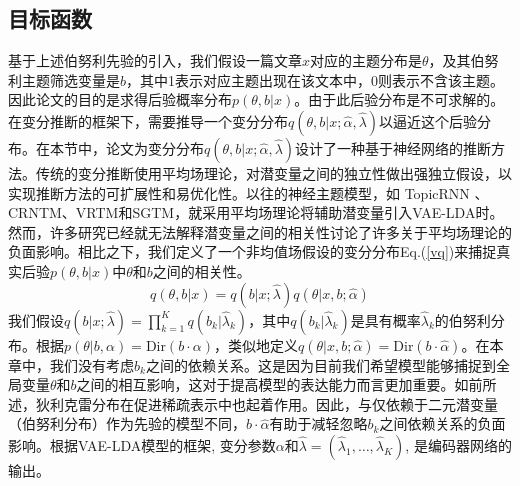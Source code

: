 \subsection{目标函数}
基于上述伯努利先验的引入，我们假设一篇文章$x$对应的主题分布是$\theta$，及其伯努利主题筛选变量是$b$，其中1表示对应主题出现在该文本中，0则表示不含该主题。因此论文的目的是求得后验概率分布$p(\theta,b\vert x)$。由于此后验分布是不可求解的。在变分推断的框架下，需要推导一个变分分布$q(\theta,b|x;\hat{\alpha},\hat{\lambda})$以逼近这个后验分布。在本节中，论文为变分分布$q(\theta,b|x;\hat{\alpha},\hat{\lambda})$设计了一种基于神经网络的推断方法。传统的变分推断使用平均场理论，对潜变量之间的独立性做出强独立假设，以实现推断方法的可扩展性和易优化性\cite{VI}。以往的神经主题模型，如 TopicRNN \cite{TopicRNN}、CRNTM\cite{CRNTM}、VRTM\cite{VRTM}和SGTM\cite{SGTM}，就采用平均场理论将辅助潜变量引入VAE-LDA时。然而，许多研究\cite{EVO,MFnegative}已经就无法解释潜变量之间的相关性讨论了许多关于平均场理论的负面影响。相比之下，我们定义了一个非均值场假设的变分分布Eq.(\ref{vq})来捕捉真实后验$p(\theta,b\vert x)$中$\theta$和$b$之间的相关性。
\begin{equation}
    q(\theta,b\vert x)=q(b\vert x;\hat{\lambda})q(\theta\vert x,b;\hat{\alpha})
    \label{vq}
\end{equation}
我们假设$q(b\vert x;\hat{\lambda})=\prod_{k=1}^{K}q(b_k\vert \hat{\lambda}_k)$，其中$q(b_k\vert \hat{\lambda}_k)$是具有概率$\hat{\lambda}_k$的伯努利分布。根据$p(\theta\vert b,\alpha)=\mbox{Dir}(b\cdot\alpha)$，类似地定义$q(\theta\vert x,b;\hat{\alpha})=\mbox{Dir}(b\cdot\hat{\alpha})$。在本章中，我们没有考虑$b_k$之间的依赖关系。这是因为目前我们希望模型能够捕捉到全局变量$\theta$和$b$之间的相互影响，这对于提高模型的表达能力而言更加重要。如前所述，狄利克雷分布在促进稀疏表示中也起着作用。因此，与仅依赖于二元潜变量（伯努利分布）作为先验的模型不同，$b\cdot\hat{\alpha}$有助于减轻忽略$b_k$之间依赖关系的负面影响。根据VAE-LDA模型的框架, 变分参数$\alpha$和$\hat{\lambda}=(\hat{\lambda}_1,\dots,\hat{\lambda}_K)$, 是编码器网络的输出。

